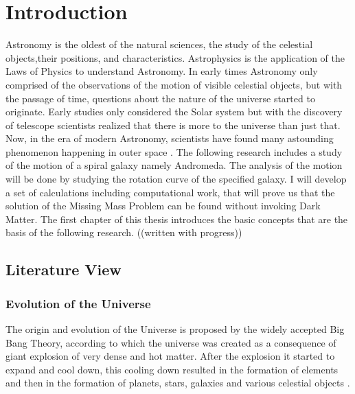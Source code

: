 \chapter{Introduction}

Astronomy is the oldest of the natural sciences, the study of the celestial objects,their positions, and characteristics. Astrophysics is the application of the Laws of Physics to understand Astronomy. In early times Astronomy only comprised of the observations of the motion of visible celestial objects, but with the passage of time, questions about the nature of the universe started to originate. Early studies only considered the Solar system but with the discovery of telescope scientists realized that there is more to the universe than just that. Now, in the era of modern Astronomy, scientists have found many astounding phenomenon happening in outer space \cite{introduction}.
The following research includes a study of the motion of a spiral galaxy namely Andromeda. The analysis of the motion will be done by studying the rotation curve of the specified galaxy. I will develop a set of calculations including computational work, that will prove us that the solution of the Missing Mass Problem can be found without invoking Dark Matter.
The first chapter of this thesis introduces the basic concepts that are the basis of the following research.
((written with progress))

\section{Literature View}

\subsection{Evolution of the Universe}
 The origin and evolution of the Universe is proposed by the widely accepted Big Bang Theory, according to which the universe was created as a consequence of giant explosion of very dense and hot matter. After the explosion it started to expand and cool down, this cooling down resulted in the formation of elements and then in the formation of planets, stars, galaxies and various celestial objects \cite{evolution}.

